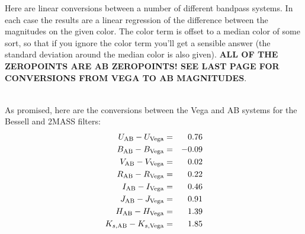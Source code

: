 \documentclass[10pt,preprint]{aastex}
\begin{document}
Here are linear conversions between a number of different bandpass
systems. In each case the results are a linear regression of the
difference between the magnitudes on the given color. The color term
is offset to a median color of some sort, so that if you ignore the
color term you'll get a sensible answer (the standard deviation around
the median color is also given).  {\bf ALL OF THE ZEROPOINTS ARE AB
ZEROPOINTS! SEE LAST PAGE FOR CONVERSIONS FROM VEGA TO AB MAGNITUDES}.
 
\begin{eqnarray}

\end{eqnarray}

\clearpage

As promised, here are the conversions between the Vega and AB systems
for the Bessell and 2MASS filters:
\begin{eqnarray}
U_{\mathrm{AB}} -U_{\mathrm{Vega}} &=& 0.76 \cr
B_{\mathrm{AB}} -B_{\mathrm{Vega}} &=& -0.09 \cr
V_{\mathrm{AB}} -V_{\mathrm{Vega}} &=& 0.02 \cr
R_{\mathrm{AB}} -R_{\mathrm{Vega}} &=& 0.22 \cr
I_{\mathrm{AB}} -I_{\mathrm{Vega}} &=& 0.46 \cr
J_{\mathrm{AB}} -J_{\mathrm{Vega}} &=& 0.91 \cr
H_{\mathrm{AB}} -H_{\mathrm{Vega}} &=& 1.39 \cr
K_{s,\mathrm{AB}} -K_{s,\mathrm{Vega}} &=& 1.85 
\end{eqnarray}
\end{document}

